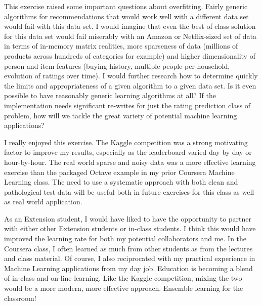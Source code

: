 \documentclass[11pt, oneside]{article}   	%
\begin{document}
This exercise raised some important questions about overfitting. Fairly generic algorithms for recommendations that would work well with a different data set would fail with this data set. I would imagine that even the best of class solution for this data set would fail miserably with an Amazon or Netflix-sized set of data in terms of in-memory matrix realities, more sparseness of data (millions of products across hundreds of categories for example) and higher dimensionality of person and item features (buying history, multiple people-per-household, evolution of ratings over time). I would further research how to determine quickly the limits and appropriateness of a given algorithm to a given data set. Is it even possible to have reasonably generic learning algorithms at all? If the implementation needs significant re-writes for just the rating prediction class of problem, how will we tackle the great variety of potential machine learning applications?

I really enjoyed this exercise. The Kaggle competition was a strong motivating factor to improve my results, especially as the leaderboard varied day-by-day or hour-by-hour. The real world sparse and noisy data was a more effective learning exercise than the packaged Octave example in my prior Coursera Machine Learning class. The need to use a systematic approach with both clean and pathological test data will be useful both in future exercises for this class as well as real world application.

As an Extension student, I would have liked to have the opportunity to partner with either other Extension students or in-class students. I think this would have improved the learning rate for both my potential collaborators and me. In the Coursera class, I often learned as much from other students as from the lectures and class material. Of course, I also reciprocated with my practical experience in Machine Learning applications from my day job. Education is becoming a blend of in-class and on-line learning. Like the Kaggle competition, mixing the two would be a more modern, more effective approach. Ensemble learning for the classroom!
\end{document}
